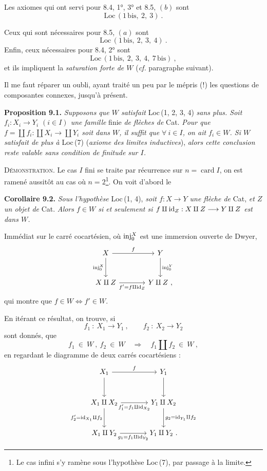 Les axiomes qui ont servi pour 8.4, 1°, 3° et 8.5, $(b)$ sont
\[
\mathrm{Loc}\,(1\,\mathrm{bis},\ 2,\ 3)\ .
\]


Ceux qui sont nécessaires pour 8.5, $(a)$ sont
\[
\mathrm{Loc}\,(1\,\mathrm{bis},\ 2,\ 3,\ 4)\ .
\]
Enfin, ceux nécessaires pour 8.4, 2° sont
\[
\mathrm{Loc}\,(1\,\mathrm{bis},\ 2,\ 3,\ 4,\ 7\,\mathrm{bis})\ ,
\]
et ils impliquent la \textit{saturation forte de $W$} (\textit{cf.} paragraphe suivant).

Il me faut réparer un oubli, ayant traité un peu par le mépris (!) les questions de composantes connexes, jusqu'à présent.

\textbf{Proposition 9.1.} \textit{Supposons que $W$ satisfait} Loc\,(1, 2, 3, 4) \textit{sans plus. Soit $f_i : X_i\longrightarrow Y_i$ $(i\in I)$ une famille} finie \textit{de flèches de} Cat. \textit{Pour que $f=\coprod f_i : \coprod X_i\longrightarrow\coprod Y_i$ soit dans $W$, il suffit que $\forall\ i\in I$, on ait $f_i\in W$. Si $W$ satisfait de plus à} Loc\,(7) (\textit{axiome des limites inductives}), \textit{alors cette conclusion reste valable sans condition de finitude sur $I$.}

\textsc{Démonstration}. Le cas $I$ fini se traite par récurrence sur $n=\operatorname{card}I$, on est ramené aussitôt au cas où $n=2$\footnote[46]{Le cas infini s'y ramène sous l'hypothèse Loc\,(7), par passage à la limite.}. On voit d'abord le


\textbf{Corollaire 9.2.} \textit{Sous l'hypothèse} Loc\,(1, 4), \textit{soit $f : X\longrightarrow Y$ une flèche de} Cat, \textit{et $Z$ un objet de} Cat. \textit{Alors $f\in W$ si et seulement si $f\amalg\mathrm{id}_Z : X\amalg Z\longrightarrow Y\amalg Z$ est dans $W$.}

Immédiat sur le carré cocartésien, où $\mathrm{inj}_0^X$ est une immersion ouverte de Dwyer,
\[
\begin{tikzcd}[column sep=large, row sep=large]
X \arrow[r, "f"] \arrow[d, "\inj_0^X"'] & Y \arrow[d, "\inj_0^Y"] \\
X\amalg Z \arrow[r, "f'=f\amalg\id_Z"'] & Y\amalg Z\ ,
\end{tikzcd}
\]
qui montre que $f\in W\iff f'\in W$.

En itérant ce résultat, on trouve, si
\[
f_1\ :\ X_1\longrightarrow Y_1\ ,\qquad f_2\ :\ X_2\longrightarrow Y_2
\]
sont donnés, que
\[
f_1\ \in\ W\ ,\ f_2\ \in\ W\quad\Longrightarrow\quad f_1\amalg f_2\ \in\ W\ ,
\]
en regardant le diagramme de deux carrés cocartésiens :
\[
\begin{tikzcd}[column sep=large, row sep=large]
X_1 \arrow[r, "f"] \arrow[d] & Y_1 \arrow[d] \\ %
X_1\amalg X_2 \arrow[r, "f'_1=f_1\amalg\id_{X_2}"'] \arrow[d, "f'_2=\id_{X_1}\amalg f_2"'] & Y_1\amalg X_2 \arrow[d, "g_2=\id_{Y_1}\amalg f_2"] \\
X_1\amalg Y_2 \arrow[r, "g_1=f_1\amalg\id_{Y_2}"'] & Y_1\amalg Y_2\ .
\end{tikzcd}
\]

